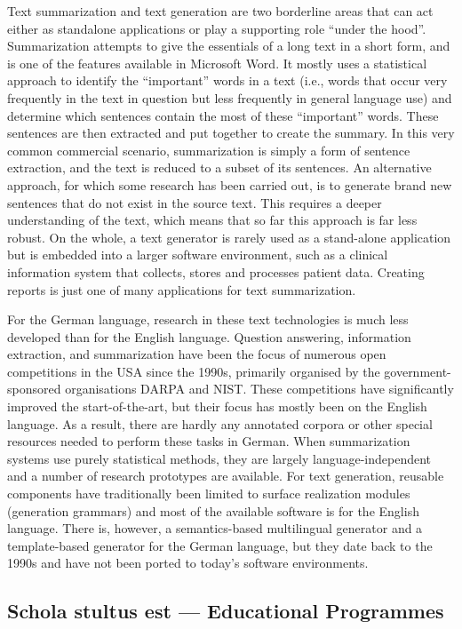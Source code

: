 \documentclass[]{../metanetpaper}
\begin{document}
\begin{Parallel}[c]{80mm}{80mm}
{    Text summarization and text generation are two borderline areas that can act either as standalone applications or play a supporting role “under the hood”. Summarization attempts to give the essentials of a long text in a short form, and is one of the features available in Microsoft Word. It mostly uses a statistical approach to identify the “important” words in a text (i.e., words that occur very frequently in the text in question but less frequently in general language use) and determine which sentences contain the most of these “important” words. These sentences are then extracted and put together to create the summary. In this very common commercial scenario, summarization is simply a form of sentence extraction, and the text is reduced to a subset of its sentences. An alternative approach, for which some research has been carried out, is to generate brand new sentences that do not exist in the source text. This requires a deeper understanding of the text, which means that so far this approach is far less robust. On the whole, a text generator is rarely used as a stand-alone application but is embedded into a larger software environment, such as a clinical information system that collects, stores and processes patient data. Creating reports is just one of many applications for text summarization. 

    For the German language, research in these text technologies is much less developed than for the English language. Question answering, information extraction, and summarization have been the focus of numerous open competitions in the USA since the 1990s, primarily organised by the government-sponsored organisations DARPA and NIST. These competitions have significantly improved the start-of-the-art, but their focus has mostly been on the English language. As a result, there are hardly any annotated corpora or other special resources needed to perform these tasks in German. When summarization systems use purely statistical methods, they are largely language-independent and a number of research prototypes are available. For text generation, reusable components have traditionally been limited to surface realization modules (generation grammars) and most of the available software is for the English language. There is, however, a semantics-based multilingual generator and a template-based generator for the German language, but they date back to the 1990s and have not been ported to today’s software environments.
  }
  
  \ParallelPar


  \subsection{Schola stultus est --- Educational Programmes}


\end{Parallel}
\end{document}

